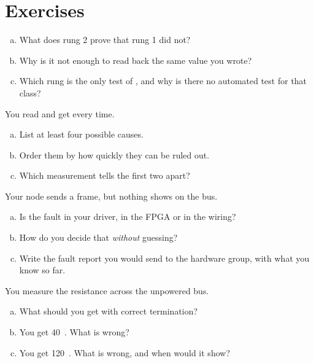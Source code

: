 \section*{Exercises}

\label{ex:13:1}
\begin{enumerate}[a)]
  \item What does rung 2 prove that rung 1 did not?
  \item Why is it not enough to read back the same value you wrote?
  \item Which rung is the only test of , and why is there no automated test
    for that class?
\end{enumerate}

\label{ex:13:2}
You read  and get  every time.
\begin{enumerate}[a)]
  \item List at least four possible causes.
  \item Order them by how quickly they can be ruled out.
  \item Which measurement tells the first two apart?
\end{enumerate}

\label{ex:13:3}
Your node sends a frame, but nothing shows on the bus.
\begin{enumerate}[a)]
  \item Is the fault in your driver, in the FPGA or in the wiring?
  \item How do you decide that \emph{without} guessing?
  \item Write the fault report you would send to the hardware group, with what you know so far.
\end{enumerate}

\label{ex:13:4}
You measure the resistance across the unpowered bus.
\begin{enumerate}[a)]
  \item What should you get with correct termination?
  \item You get 40~\textohm. What is wrong?
  \item You get 120~\textohm. What is wrong, and when would it show?
\end{enumerate}
